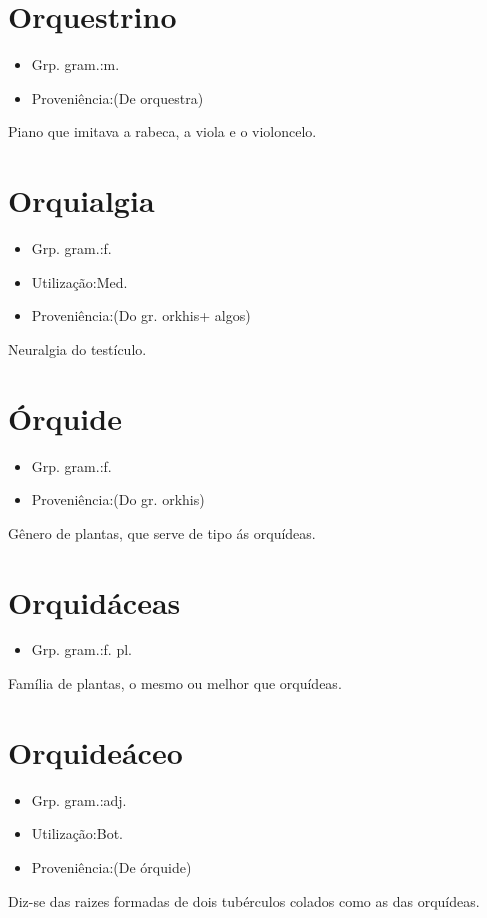 \section{Orquestrino}
\begin{itemize}
\item {Grp. gram.:m.}
\end{itemize}
\begin{itemize}
\item {Proveniência:(De \textunderscore orquestra\textunderscore )}
\end{itemize}
Piano que imitava a rabeca, a viola e o violoncelo.
\section{Orquialgia}
\begin{itemize}
\item {Grp. gram.:f.}
\end{itemize}
\begin{itemize}
\item {Utilização:Med.}
\end{itemize}
\begin{itemize}
\item {Proveniência:(Do gr. \textunderscore orkhis\textunderscore  + \textunderscore algos\textunderscore )}
\end{itemize}
Neuralgia do testículo.
\section{Órquide}
\begin{itemize}
\item {Grp. gram.:f.}
\end{itemize}
\begin{itemize}
\item {Proveniência:(Do gr. \textunderscore orkhis\textunderscore )}
\end{itemize}
Gênero de plantas, que serve de tipo ás orquídeas.
\section{Orquidáceas}
\begin{itemize}
\item {Grp. gram.:f. pl.}
\end{itemize}
Família de plantas, o mesmo ou melhor que \textunderscore orquídeas\textunderscore .
\section{Orquideáceo}
\begin{itemize}
\item {Grp. gram.:adj.}
\end{itemize}
\begin{itemize}
\item {Utilização:Bot.}
\end{itemize}
\begin{itemize}
\item {Proveniência:(De \textunderscore órquide\textunderscore )}
\end{itemize}
Diz-se das raizes formadas de dois tubérculos colados como as das orquídeas.
